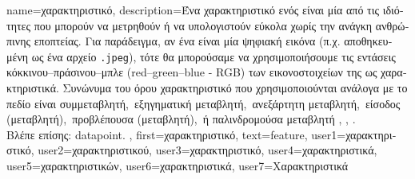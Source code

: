 {name={\foreignlanguage{greek}{χαρακτηριστικό}},
	description={\foreignlanguage{greek}{Ένα χαρακτηριστικό ενός} 
		 \foreignlanguage{greek}{είναι μία από τις ιδιότητες που μπορούν να μετρηθούν  
		ή να υπολογιστούν εύκολα χωρίς την ανάγκη ανθρώπινης εποπτείας. Για παράδειγμα, αν ένα}  
		\foreignlanguage{greek}{είναι μία ψηφιακή εικόνα (π.χ. αποθηκευμένη ως ένα αρχείο} \texttt{.jpeg}), 
		\foreignlanguage{greek}{τότε θα μπορούσαμε να χρησιμοποιήσουμε τις εντάσεις κόκκινου–πράσινου–μπλε}
		(red–green–blue - RGB) \foreignlanguage{greek}{των εικονοστοιχείων της ως χαρακτηριστικά. 
		Συνώνυμα του όρου χαρακτηριστικό που χρησιμοποιούνται ανάλογα 
		με το πεδίο εί\-ναι \guillemotleft συμμεταβλητή,\guillemotright\ \guillemotleft εξηγηματική μεταβλητή,\guillemotright\ 
		\guillemotleft ανεξάρτητη μεταβλητή,\guillemotright\ \guillemotleft είσοδος (μεταβλητή),\guillemotright\ 
		\guillemotleft προβλέπουσα (μεταβλητή),\guillemotright\ ή 
		\guillemotleft παλινδρομούσα μεταβλητή\guillemotright} \cite{Gujarati2021}, \cite{Dodge2003}, \cite{Everitt2022}.\\
		\foreignlanguage{greek}{Βλέπε επίσης:} \gls{datapoint}. }, 
	first={\foreignlanguage{greek}{χαρακτηριστικό}},
	text={feature},
	user1={\foreignlanguage{greek}{χαρακτηριστικό}}, %
	user2={\foreignlanguage{greek}{χαρακτηριστικού}}, %
	user3={\foreignlanguage{greek}{χαρακτηριστικό}}, %
	user4={\foreignlanguage{greek}{χαρακτηριστικά}}, %
	user5={\foreignlanguage{greek}{χαρακτηριστικών}}, %
	user6={\foreignlanguage{greek}{χαρακτηριστικά}}, %
	user7={\foreignlanguage{greek}{Χαρακτηριστικά}} %
}

